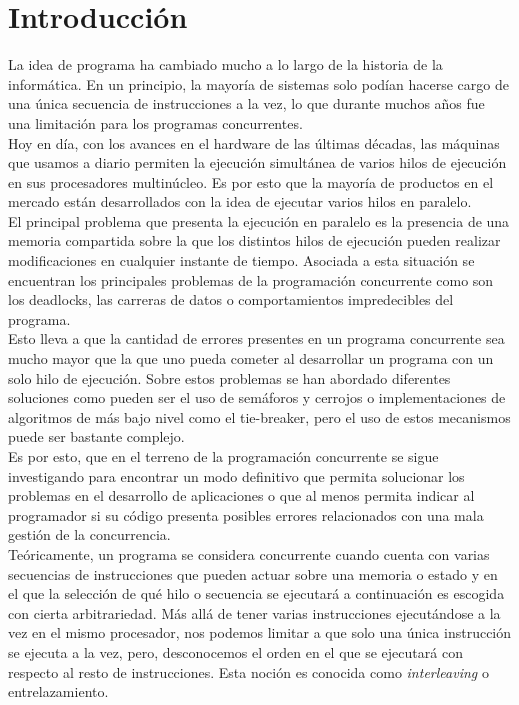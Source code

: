 \chapter{Introducción}
La idea de programa ha cambiado mucho a lo largo de la historia de la informática. En un principio, la mayoría de sistemas solo podían hacerse cargo de una única secuencia de instrucciones a la vez, lo que durante muchos años fue una limitación para los programas concurrentes.\\

Hoy en día, con los avances en el hardware de las últimas décadas, las máquinas que usamos a diario permiten la ejecución simultánea de varios hilos de ejecución en sus procesadores multinúcleo. Es por esto que la mayoría de productos en el mercado están desarrollados con la idea de ejecutar varios hilos en paralelo.\\

El principal problema que presenta la ejecución en paralelo es la presencia de una memoria compartida sobre la que los distintos hilos de ejecución pueden realizar modificaciones en cualquier instante de tiempo. Asociada a esta situación se encuentran los principales problemas de la programación concurrente como son los deadlocks, las carreras de datos o comportamientos impredecibles del programa.\\

Esto lleva a que la cantidad de errores presentes en un programa concurrente sea mucho mayor que la que uno pueda cometer al desarrollar un programa con un solo hilo de ejecución. Sobre estos problemas se han abordado diferentes soluciones como pueden ser el uso de semáforos y cerrojos o implementaciones de algoritmos de más bajo nivel como el tie-breaker, pero el uso de estos mecanismos puede ser bastante complejo.\\

Es por esto, que en el terreno de la programación concurrente se sigue investigando para encontrar un modo definitivo que permita solucionar los problemas en el desarrollo de aplicaciones o que al menos permita indicar al programador si su código presenta posibles errores relacionados con una mala gestión de la concurrencia.\\

Teóricamente, un programa se considera concurrente cuando cuenta con varias secuencias de instrucciones que pueden actuar sobre una memoria o estado y en el que la selección de qué hilo o secuencia se ejecutará a continuación es escogida con cierta arbitrariedad. Más allá de tener varias instrucciones ejecutándose a la vez en el mismo procesador, nos podemos limitar a que solo una única instrucción se ejecuta a la vez, pero, desconocemos el orden en el que se ejecutará con respecto al resto de instrucciones. Esta noción es conocida como \emph{interleaving} o entrelazamiento.\\

